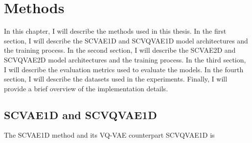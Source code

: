 \chapter{Methods}

In this chapter, I will describe the methods used in this thesis. In the first section, I will describe the SCVAE1D and SCVQVAE1D model architectures and the training process. In the second section, I will describe the SCVAE2D and SCVQVAE2D model architectures and the training process. In the third section, I will describe the evaluation metrics used to evaluate the models. In the fourth section, I will describe the datasets used in the experiments. Finally, I will provide a brief overview of the implementation details.

\section{SCVAE1D and SCVQVAE1D}

The SCVAE1D method and its VQ-VAE counterpart SCVQVAE1D is 



